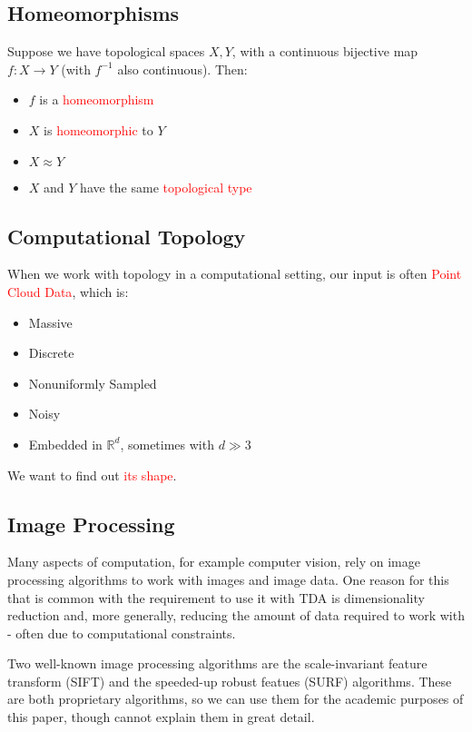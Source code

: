 \documentclass[a4paper]{article}
\begin{document}
\subsection*{Homeomorphisms}
Suppose we have topological spaces $X, Y$, with a continuous bijective map $f: X \to Y$ (with $f^{-1}$ also continuous). Then:
\begin{itemize}
\item $f$ is a \textcolor{red}{homeomorphism}
\item $X$ is \textcolor{red}{homeomorphic} to $Y$
\item $X \approx Y$
\item $X$ and $Y$ have the same \textcolor{red}{topological type}
\end{itemize}

\subsection*{Computational Topology}
When we work with topology in a computational setting, our input is often \textcolor{red}{Point Cloud Data}, which is:
\begin{itemize}
\item Massive
\item Discrete
\item Nonuniformly Sampled
\item Noisy
\item Embedded in $\mathbb{R}^{d}$, sometimes with $d \gg 3$
\end{itemize}

We want to find out \textcolor{red}{its shape}.

\subsection*{Image Processing}
Many aspects of computation, for example computer vision, rely on image processing algorithms to work with images and image data. One reason for this that is common with the requirement to use it with TDA is dimensionality reduction and, more generally, reducing the amount of data required to work with - often due to computational constraints.

Two well-known image processing algorithms are the scale-invariant feature transform (SIFT) and the speeded-up robust featues (SURF) algorithms. These are both proprietary algorithms, so we can use them for the academic purposes of this paper, though cannot explain them in great detail.
\end{document}
